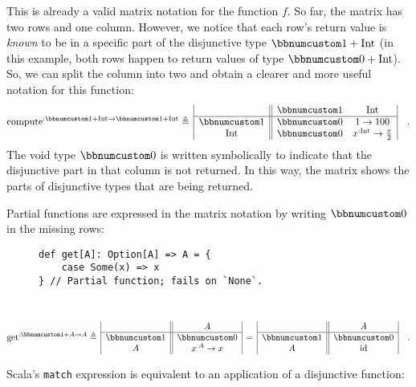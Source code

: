 This is already a valid matrix notation for the function $f$. So
far, the matrix has two rows and one column. However, we notice that
each row\textsf{'}s return value is \emph{known} to be in a specific part of
the disjunctive type $\bbnum 1+\text{Int}$ (in this example, both
rows happen to return values of type $\bbnum 0+\text{Int}$). So,
we can split the column into two and obtain a clearer and more useful
notation for this function:
\[
\text{compute}^{:\bbnum 1+\text{Int}\rightarrow\bbnum 1+\text{Int}}\triangleq\,\begin{array}{|c||cc|}
 & \bbnum 1 & \text{Int}\\
\hline \bbnum 1 & \bbnum 0 & 1\rightarrow100\\
\text{Int} & \bbnum 0 & x^{:\text{Int}}\rightarrow\frac{x}{2}
\end{array}\quad.
\]
The void type $\bbnum 0$ is
written symbolically to indicate that the disjunctive part in that
column is not returned. In this way, the matrix shows the parts of
disjunctive types that are being returned. 

Partial functions are expressed in the matrix notation by writing
$\bbnum 0$ in the missing rows:

\begin{wrapfigure}{l}{0.45\columnwidth}%
\vspace{-0.65\baselineskip}
\begin{lstlisting}
def get[A]: Option[A] => A = {
    case Some(x) => x
} // Partial function; fails on `None`.
\end{lstlisting}

\vspace{-0.75\baselineskip}
\end{wrapfigure}%

~\vspace{-1.35\baselineskip}
\[
\text{get}^{:\bbnum 1+A\rightarrow A}\triangleq\,\begin{array}{|c||c|}
 & A\\
\hline \bbnum 1 & \bbnum 0\\
A & x^{:A}\rightarrow x
\end{array}\,=\,\begin{array}{|c||c|}
 & A\\
\hline \bbnum 1 & \bbnum 0\\
A & \text{id}
\end{array}\quad.
\]
\vspace{-0.9\baselineskip}

Scala\textsf{'}s \lstinline!match! expression is equivalent to an application
of a disjunctive function:

